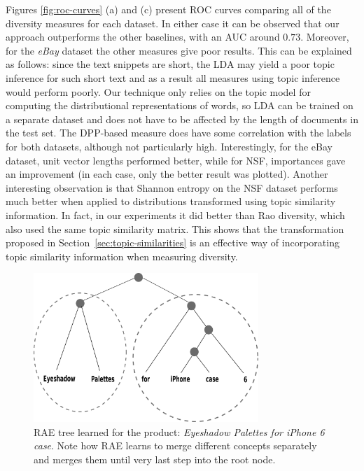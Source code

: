 Figures \ref{fig:roc-curves} (a) and (c)
present ROC curves comparing all of the diversity measures for each dataset.
In either case it can be observed
that our approach outperforms the other baselines, with an AUC
around $0.73$. Moreover, for the {\em eBay} dataset the other measures
give poor results. This can be explained as follows: since the
text snippets are short, the LDA may yield a poor topic inference for
such short text and as a result all measures using topic inference
would perform poorly. Our technique only relies on the topic model for
computing the distributional representations of words, so LDA can be
trained on a separate dataset and does not have to be affected by the
length of documents in the test set.
 The DPP-based measure does have some correlation
with the labels for both datasets, although not particularly
high. Interestingly, for the eBay dataset, unit vector lengths
performed better, while for NSF, importances gave an improvement (in
each case, only the better result was
plotted). Another interesting observation is that 
Shannon entropy on the NSF dataset performs much better when applied
to distributions transformed using topic similarity information. In
fact, in our experiments it did better than Rao diversity, which also
used the same topic similarity matrix. This shows that the
transformation proposed in Section~\ref{sec:topic-similarities} is an
effective way of incorporating topic similarity information when
measuring diversity.
\begin{figure}
\centering
\includegraphics[width=8.5cm]{figures/RAE-example.png}
\caption{RAE tree learned for the product: {\it Eyeshadow Palettes for iPhone 6 case}. Note how RAE learns to merge different concepts separately and merges them until very last step into the root node.}
\label{fig:rae-example}
\end{figure}

